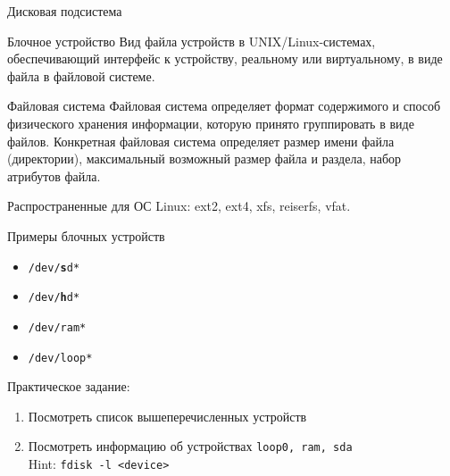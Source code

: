 \begin{frame}{Дисковая подсистема}

	\begin{block}{Блочное устройство}
		Вид файла устройств в UNIX/Linux-системах,  обеспечивающий интерфейс к устройству,
		реальному или виртуальному, в виде файла в файловой системе.
	\end{block}

	\begin{block}{Файловая система}
		Файловая система определяет формат содержимого и способ физического хранения информации,  
		которую принято группировать в виде файлов. 
		Конкретная файловая система определяет размер имени файла (директории),  
		максимальный возможный размер файла и раздела,  набор атрибутов файла.

		Распространенные для ОС Linux: ext2, ext4, xfs, reiserfs, vfat.
	\end{block}
\end{frame}

\begin{frame}{Примеры блочных устройств}

	\begin{itemize}
		\item {\tt /dev/{\bf s}d*}
		\item {\tt /dev/{\bf h}d*}
		\item {\tt /dev/ram*}
		\item {\tt /dev/loop*}
	\end{itemize}

	\begin{block}{Практическое задание:}
		\begin{enumerate}
			\item Посмотреть список вышеперечисленных устройств
			\item Посмотреть информацию об устройствах {\tt loop0, ram, sda}\\
				Hint: {\tt fdisk -l <device>}
		\end{enumerate}
	\end{block}
\end{frame}

